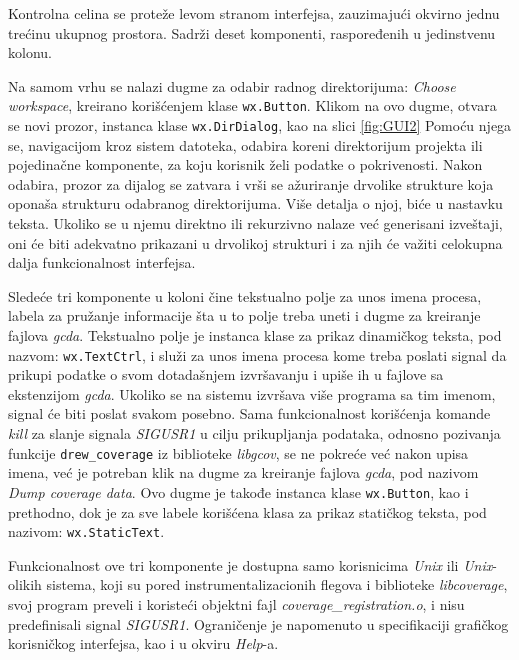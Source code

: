 \documentclass[12pt,oneside]{memoir}
\newcommand{\kod}[1]{\texttt{#1}}
\newcommand{\strano}[1]{\textit{#1}}
\begin{document}
Kontrolna celina se proteže levom stranom interfejsa, zauzimajući okvirno jednu trećinu ukupnog prostora. Sadrži deset komponenti, raspoređenih u jedinstvenu kolonu. 

Na samom vrhu se nalazi dugme za odabir radnog direktorijuma: \strano{Choose workspace}, kreirano korišćenjem klase \kod{wx.Button}. Klikom na ovo dugme, otvara se novi prozor, instanca klase \kod{wx.DirDialog}, kao na slici \ref{fig:GUI2} Pomoću njega se, navigacijom kroz sistem datoteka, odabira koreni direktorijum projekta ili pojedinačne komponente, za koju korisnik želi podatke o pokrivenosti. Nakon odabira, prozor za dijalog se zatvara i vrši se ažuriranje drvolike strukture koja oponaša strukturu odabranog direktorijuma. Više detalja o njoj, biće u nastavku teksta. Ukoliko se u njemu direktno ili rekurzivno nalaze već generisani izveštaji, oni će biti adekvatno prikazani u drvolikoj strukturi i za njih će važiti celokupna dalja funkcionalnost interfejsa. 

Sledeće tri komponente u koloni čine tekstualno polje za unos imena procesa, labela za pružanje informacije šta u to polje treba uneti i dugme za kreiranje fajlova \strano{gcda}. Tekstualno polje je instanca klase za prikaz dinamičkog teksta, pod nazvom: \kod{wx.TextCtrl}, i služi za unos imena procesa kome treba poslati signal da prikupi podatke o svom dotadašnjem izvršavanju i upiše ih u fajlove sa ekstenzijom \strano{gcda}. Ukoliko se na sistemu izvršava više programa sa tim imenom, signal će biti poslat svakom posebno. Sama funkcionalnost korišćenja komande \strano{kill} za slanje signala \strano{SIGUSR1} u cilju prikupljanja podataka, odnosno pozivanja funkcije \kod{drew\_coverage} iz biblioteke \strano{libgcov}, se ne pokreće već nakon upisa imena, već je potreban klik na dugme za kreiranje fajlova \strano{gcda}, pod nazivom \strano{Dump coverage data}. Ovo dugme je takođe instanca klase \kod{wx.Button}, kao i prethodno, dok je za sve labele korišćena klasa za prikaz statičkog teksta, pod nazivom: \kod{wx.StaticText}. 


Funkcionalnost ove tri komponente je dostupna samo korisnicima \strano{Unix} ili \strano{Unix}-olikih sistema, koji su pored instrumentalizacionih flegova i biblioteke \strano{libcoverage}, svoj program preveli i koristeći objektni fajl \strano{coverage\_registration.o}, i nisu predefinisali signal \strano{SIGUSR1}. Ograničenje je napomenuto u specifikaciji grafičkog korisničkog interfejsa, kao i u okviru \strano{Help}-a. 
\end{document}
